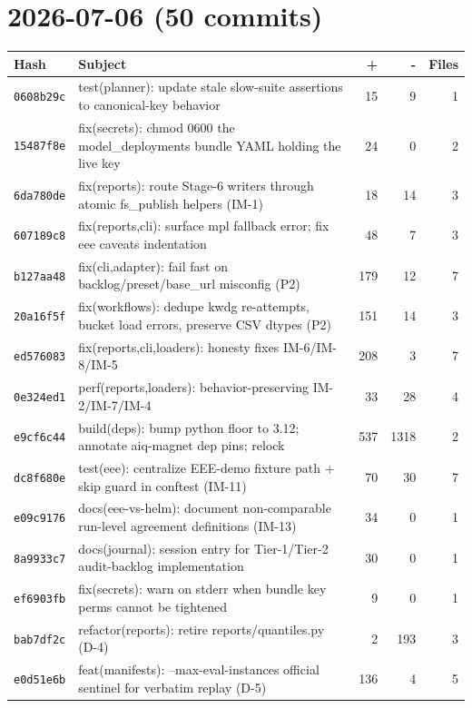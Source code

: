\section*{2026-07-06 (50 commits)}
\begin{longtable}{@{}p{}p{}r r r@{}}
\toprule Hash & Subject & + & - & Files \\ \midrule\endhead
\texttt{0608b29c} & test(planner): update stale slow-suite assertions to canonical-key behavior & 15 & 9 & 1 \\
\texttt{15487f8e} & fix(secrets): chmod 0600 the model\_deployments bundle YAML holding the live key & 24 & 0 & 2 \\
\texttt{6da780de} & fix(reports): route Stage-6 writers through atomic fs\_publish helpers (IM-1) & 18 & 14 & 3 \\
\texttt{607189c8} & fix(reports,cli): surface mpl fallback error; fix eee caveats indentation & 48 & 7 & 3 \\
\texttt{b127aa48} & fix(cli,adapter): fail fast on backlog/preset/base\_url misconfig (P2) & 179 & 12 & 7 \\
\texttt{20a16f5f} & fix(workflows): dedupe kwdg re-attempts, bucket load errors, preserve CSV dtypes (P2) & 151 & 14 & 3 \\
\texttt{ed576083} & fix(reports,cli,loaders): honesty fixes IM-6/IM-8/IM-5 & 208 & 3 & 7 \\
\texttt{0e324ed1} & perf(reports,loaders): behavior-preserving IM-2/IM-7/IM-4 & 33 & 28 & 4 \\
\texttt{e9cf6c44} & build(deps): bump python floor to 3.12; annotate aiq-magnet dep pins; relock & 537 & 1318 & 2 \\
\texttt{dc8f680e} & test(eee): centralize EEE-demo fixture path + skip guard in conftest (IM-11) & 70 & 30 & 7 \\
\texttt{e09c9176} & docs(eee-vs-helm): document non-comparable run-level agreement definitions (IM-13) & 34 & 0 & 1 \\
\texttt{8a9933c7} & docs(journal): session entry for Tier-1/Tier-2 audit-backlog implementation & 30 & 0 & 1 \\
\texttt{ef6903fb} & fix(secrets): warn on stderr when bundle key perms cannot be tightened & 9 & 0 & 1 \\
\texttt{bab7df2c} & refactor(reports): retire reports/quantiles.py (D-4) & 2 & 193 & 3 \\
\texttt{e0d51e6b} & feat(manifests): --max-eval-instances official sentinel for verbatim replay (D-5) & 136 & 4 & 5 \\

\end{longtable}
